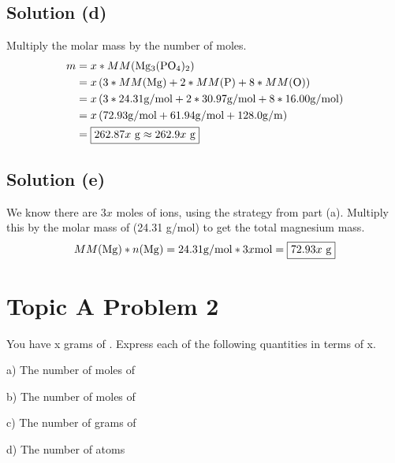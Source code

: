 \documentclass[10pt]{article}
\begin{document}
        \subsection{Solution (d)}
            Multiply the molar mass by the number of moles.
            \begin{align}
                m   &=  x * MM(\ce{Mg3(PO4)2})\\
                    &=  x \left( 3*MM(\ce{Mg}) + 2 * MM(\ce{P}) + 8 * MM(\ce{O}) \right)\\
                    &=  x \left( 3 * 24.31 \unit{\gram/\mol} + 2 * 30.97 \unit{\gram/\mol} + 8 * 16.00 \unit{\gram/\mol} \right)\\
                    &=  x \left( 72.93 \unit{\gram/\mol} + 61.94 \unit{\gram/mol} + 128.0 \unit{\gram/\meter} \right)\\
                    &=  \boxed{262.87x\ \unit{\gram}
                    \approx 262.9x\ \unit{\gram}}
            \end{align}

        \subsection{Solution (e)}
            We know there are $3x$ moles of  ions, using the strategy from part (a).
            Multiply this by the molar mass of  (24.31 \unit{\gram/\mole}) to get the total magnesium mass. 
            \begin{equation}
                MM(\ce{Mg}) * n(\ce{Mg})    =   24.31 \unit{\gram/\mole} * 3x \unit{\mole}
                    =   \boxed{72.93x\ \unit{\gram}}
            \end{equation}


    \pagebreak
    \section{Topic A Problem 2}
        You have x grams of . 
        Express each of the following quantities in terms of x.

        a) The number of moles of 

        b) The number of moles of 

        c) The number of grams of 

        d) The number of  atoms
\end{document}
